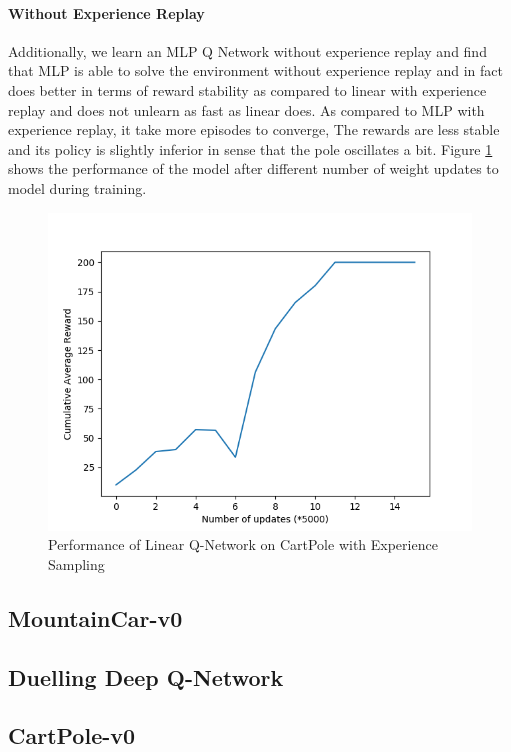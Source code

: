 \documentclass[12pt]{article}
\begin{document}
\paragraph{Without Experience Replay} Additionally, we learn an MLP Q Network without experience replay and find that MLP is able to solve the environment without experience replay and in fact does better in terms of reward stability as compared to linear with experience replay and does not unlearn as fast as linear does. As compared to MLP with experience replay, it take more episodes to converge, The rewards are less stable and its policy is slightly inferior in sense that the pole oscillates a bit. Figure \ref{fig:04} shows the performance of the model after different number of weight updates to model during training.

\begin{figure}[h]
  \centering
  \vspace{-5mm}
  \includegraphics[width=0.8\linewidth]{figures/reward_plot_03.png}
  \caption{Performance of Linear Q-Network on CartPole with Experience Sampling}
  \label{fig:04}
\end{figure}

\pagebreak[4]
\subsection*{MountainCar-v0}

\pagebreak[4]
\subsection{Duelling Deep Q-Network}
\subsection*{CartPole-v0}
\end{document}
